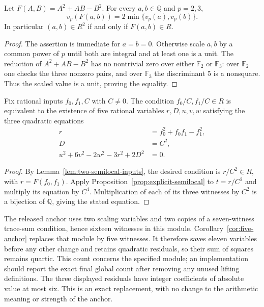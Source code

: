 \begin{lemma}\label{lem:two-semilocal-inputs}
Let $F(A,B)=A^2+AB-B^2$. For every $a,b\in\mathbb Q$ and $p=2,3$,
\[
 v_p(F(a,b))=2\min\{v_p(a),v_p(b)\}.
\]
In particular $(a,b)\in R^2$ if and only if $F(a,b)\in R$.
\end{lemma}
\begin{proof}
The assertion is immediate for $a=b=0$. Otherwise scale $a,b$ by a
common power of $p$ until both are integral and at least one is a unit.
The reduction of $A^2+AB-B^2$ has no nontrivial zero over either
$\mathbb F_2$ or $\mathbb F_3$: over $\mathbb F_2$ one checks the
three nonzero pairs, and over $\mathbb F_3$ the discriminant $5$
is a nonsquare. Thus the scaled value is a unit, proving the equality.
\end{proof}

\begin{corollary}
\label{cor:five-anchor}
Fix rational inputs $f_0,f_1,C$ with $C\ne0$. The condition
$f_0/C,f_1/C\in R$ is equivalent to the existence of five rational
variables $r,D,u,v,w$ satisfying the three quadratic equations
\begin{align*}
 r&=f_0^2+f_0f_1-f_1^2,\\
 D&=C^2,\\
 u^2+6v^2-2w^2-3r^2+2D^2&=0.
\end{align*}
\end{corollary}
\begin{proof}
By Lemma~\ref{lem:two-semilocal-inputs}, the desired condition is
$r/C^2\in R$, with $r=F(f_0,f_1)$. Apply
Proposition~\ref{prop:explicit-semilocal} to $t=r/C^2$ and multiply
its equation by $C^4$. Multiplication of each of its three witnesses
by $C^2$ is a bijection of $\mathbb Q$, giving the stated equation.
\end{proof}

The released anchor uses two scaling variables and two copies of a
seven-witness trace-sum condition, hence sixteen witnesses in this module.
Corollary~\ref{cor:five-anchor} replaces that module by five witnesses.
It therefore saves eleven variables before any other change and retains
quadratic residuals, so their sum of squares remains quartic. This count
concerns the specified module; an implementation should report the exact
final global count after removing any unused lifting definitions.
The three displayed residuals have integer coefficients of absolute value
at most six. This is an exact replacement, with no change to the arithmetic
meaning or strength of the anchor.

